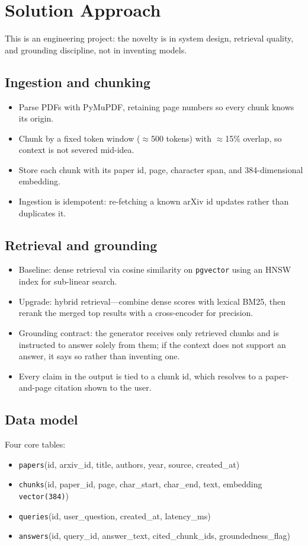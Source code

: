\documentclass[11pt,a4paper]{article}
\begin{document}
\section{Solution Approach}
This is an engineering project: the novelty is in system design, retrieval quality, and grounding discipline, not in inventing models.

\subsection{Ingestion and chunking}
\begin{itemize}[leftmargin=0.7cm]
    \item Parse PDFs with PyMuPDF, retaining page numbers so every chunk knows its origin.
    \item Chunk by a fixed token window ($\approx$500 tokens) with $\approx$15\% overlap, so context is not severed mid-idea.
    \item Store each chunk with its paper id, page, character span, and 384-dimensional embedding.
    \item Ingestion is idempotent: re-fetching a known arXiv id updates rather than duplicates it.
\end{itemize}

\subsection{Retrieval and grounding}
\begin{itemize}[leftmargin=0.7cm]
    \item Baseline: dense retrieval via cosine similarity on \texttt{pgvector} using an HNSW index for sub-linear search.
    \item Upgrade: hybrid retrieval---combine dense scores with lexical BM25, then rerank the merged top results with a cross-encoder for precision.
    \item Grounding contract: the generator receives only retrieved chunks and is instructed to answer solely from them; if the context does not support an answer, it says so rather than inventing one.
    \item Every claim in the output is tied to a chunk id, which resolves to a paper-and-page citation shown to the user.
\end{itemize}

\subsection{Data model}
Four core tables:
\begin{itemize}[leftmargin=0.7cm]
    \item \texttt{papers}(id, arxiv\_id, title, authors, year, source, created\_at)
    \item \texttt{chunks}(id, paper\_id, page, char\_start, char\_end, text, embedding \texttt{vector(384)})
    \item \texttt{queries}(id, user\_question, created\_at, latency\_ms)
    \item \texttt{answers}(id, query\_id, answer\_text, cited\_chunk\_ids, groundedness\_flag)
\end{itemize}
\end{document}
